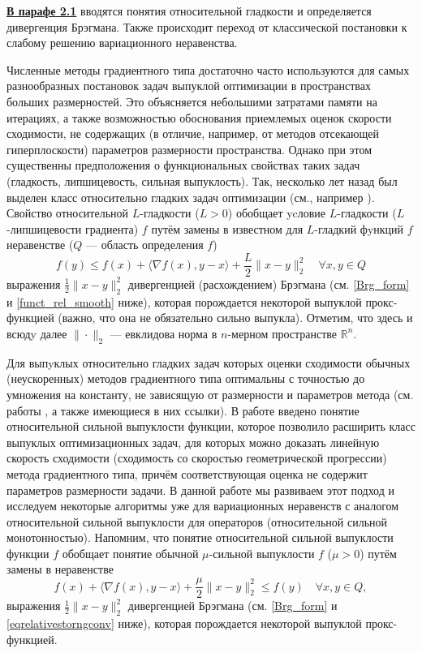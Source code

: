 \underline{\textbf{В парафе 2.1}} вводятся понятия относительной гладкости и определяется дивергенция Брэгмана. Также происходит переход от классической постановки к слабому решению вариационного неравенства. 

Численные методы градиентного типа достаточно часто используются для самых разнообразных постановок задач выпуклой оптимизации в пространствах больших размерностей. Это объясняется небольшими затратами памяти на итерациях, а также возможностью обоснования приемлемых оценок скорости сходимости, не содержащих (в отличие, например, от методов отсекающей гиперплоскости) параметров размерности пространства. Однако при этом существенны предположения о функциональных свойствах таких задач (гладкость, липшицевость, сильная выпуклость). Так, несколько лет назад был выделен класс относительно гладких задач оптимизации (см., например \cite{Bauschke,Drag,Lu_Nesterov_2018}). Свойство относительной $L$-гладкости ($L > 0$) обобщает ycловие $L$-гладкости ($L$-липшицевости градиента)  $f$ путём замены в известном для $L$-гладкий фyнкций $f$ неравенстве ($Q$ --- область определения $f$)
$$
    f(y) \leq f(x) + \langle \nabla{f(x)}, y - x \rangle  + \frac{L}{2} \|x - y \|_2^2 \quad   \forall x, y \in Q
$$	
выражения $\frac{1}{2} \|x - y \|_2^2 $ дивергенцией (расхождением) Брэгмана (см. \eqref{Brg_form} и \eqref{funct_rel_smooth} ниже), которая порождается некоторой выпуклой прокс-функцией (важно, что она не обязательно сильно выпукла). Отметим, что здесь и всюдy далее $\|\cdot\|_2$ --- евклидова норма в $n$-мерном пространстве $\mathbb{R}^n$.

Для выпyклых относительно гладких задач которых оценки сходимости обычных (неускоренных) методов градиентного типа оптимальны с точностью до умножения на константу, не зависящую от размерности и параметров метода (см. работы \cite{Bauschke,Drag,Dragomir,Lu_Nesterov_2018}, а также имеющиеся в них ссылки). В работе \cite{Lu_Nesterov_2018} введено понятие относительной сильной выпуклости функции, которое позволило расширить класс выпуклых оптимизационных задач, для которых можно доказать линейную скорость сходимости (сходимость со скоростью геометрической прогрессии) метода градиентного типа, причём соответствующая оценка не содержит параметров размерности задачи. В данной работе мы развиваем этот подход и исследуем некоторые алгоритмы уже для вариационных неравенств с аналогом относительной сильной выпуклости для операторов (относительной сильной монотонностью). Напомним, что понятие относительной сильной выпуклости \cite{Lu_Nesterov_2018} функции $f$ обобщает понятие обычной $\mu$-сильной выпуклости $f$ ($\mu > 0$) путём замены в неравенстве 
\begin{equation}
    f(x) + \langle \nabla{f(x)}, y - x \rangle  + \frac{\mu}{2} \|x - y \|_2^2 \leq f(y) \quad   \forall x, y \in Q,
    \end{equation}
выражения $\frac{1}{2} \|x - y \|_2^2 $ дивергенцией Брэгмана (см. \eqref{Brg_form} и \eqref{eqrelativestorngconv} ниже), которая порождается некоторой выпуклой прокс-функцией. 

